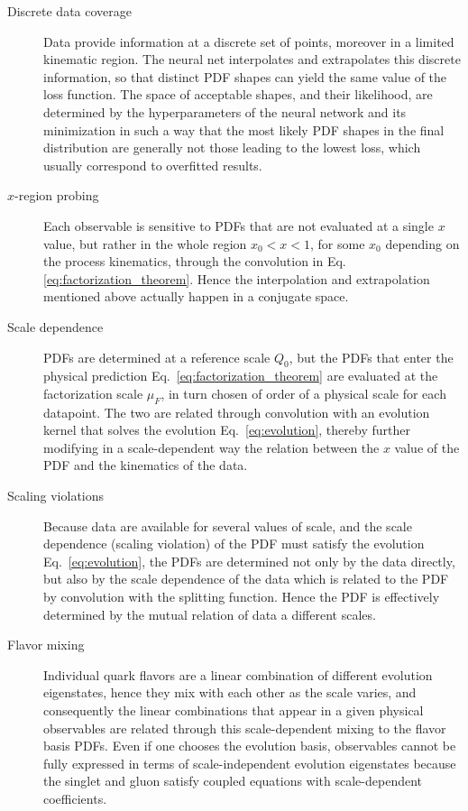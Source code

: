 \documentclass[11pt,a4paper]{article}
\begin{document}
\begin{description}

\item[Discrete data coverage]  Data provide information at a discrete set of points, moreover in a limited kinematic region. The neural net interpolates and extrapolates this discrete information, so that distinct PDF shapes can yield the same value of the loss function. The space of acceptable shapes, and their likelihood, are determined by the hyperparameters of the neural network and its minimization in such a way that the most likely PDF shapes in the final distribution are generally not those leading to the lowest loss, which usually correspond to  overfitted results. 

\item[$x$-region probing] Each observable is sensitive to PDFs that are not evaluated at a single $x$ value, but  rather in the whole region $x_0<x<1$, for some $x_0$ depending on the process kinematics, through the  convolution 
in Eq.\eqref{eq:factorization_theorem}. Hence the interpolation and extrapolation mentioned above actually happen in a conjugate space.

\item[Scale dependence] PDFs are determined at a reference scale $Q_0$, but the  PDFs that enter the physical prediction  Eq.~\eqref{eq:factorization_theorem} are evaluated   at the factorization scale $\mu_F$, in turn chosen of order of a physical scale for each datapoint. The two are related through convolution with an evolution kernel that solves the evolution Eq.~\eqref{eq:evolution}, thereby further modifying in a scale-dependent way  the relation between the $x$ value of the PDF and the kinematics of the data.
   
\item[Scaling violations] Because data are available for several values of scale, and the scale dependence (scaling violation) of the PDF must satisfy the evolution Eq.~\eqref{eq:evolution}, the PDFs are determined not only by the data directly, but also by the scale dependence of the data which is related to the PDF by convolution with the splitting function. Hence the PDF is effectively determined by the mutual relation of data a different scales.


\item[Flavor mixing] Individual quark flavors are a linear combination of different evolution eigenstates, hence they mix with each other as the scale varies, and consequently the linear combinations that appear in a given physical observables are related through this  scale-dependent mixing to the flavor basis PDFs. Even if one chooses the evolution basis, observables cannot be fully  expressed in terms of scale-independent evolution eigenstates because the  singlet and gluon satisfy coupled equations with scale-dependent coefficients.


\end{description}
\end{document}
